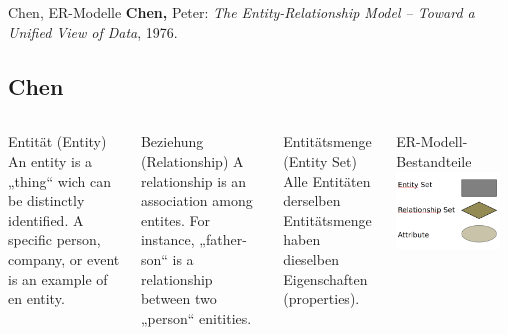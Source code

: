 \begin{frame}{Chen, ER-Modelle}
\textbf{Chen,} Peter: \emph{The Entity-Relationship Model -- Toward a Unified View of Data}, 1976.
\subsection{Chen}
  \begin{columns}[T,onlytextwidth]
\footnotesize
\begin{block}{Entität (Entity)}
    An entity is a „thing“ wich can be distinctly identified. A specific person, company, or event is an example of en entity.
\end{block}

\begin{alertblock}{Beziehung (Relationship)}
    A relationship is an association among entites. For instance, „father-son“ is a relationship between two „person“ enitities.
\end{alertblock}

\begin{exampleblock}{Entitätsmenge (Entity Set)}
    Alle Entitäten derselben Entitätsmenge haben dieselben Eigenschaften (properties).
\end{exampleblock}



      \begin{block}{ER-Modell-Bestandteile}
      \includegraphics[width=0.9\textwidth]{img/er-modell.png}
      \end{block}
      

\end{columns}
\end{frame}
